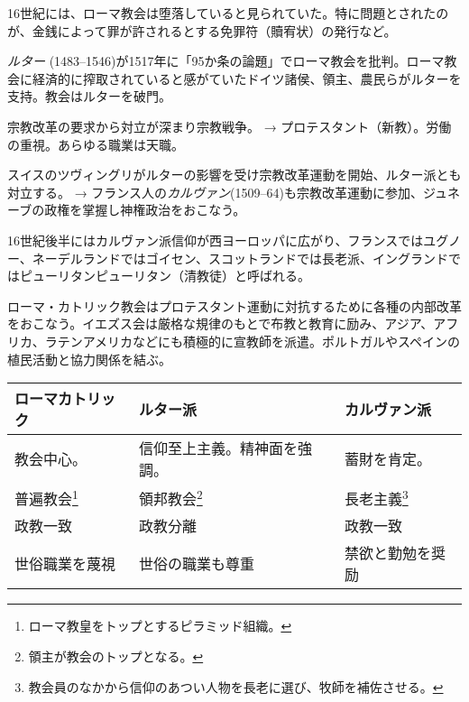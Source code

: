 \documentclass[uplatex,dvipdfmx]{jsarticle} \usepackage{mystyle}%
\begin{document}
16世紀には、ローマ教会は堕落していると見られていた。特に問題とされたのが、金銭によって罪が許されるとする免罪符（贖宥状）の発行など。

\emph{ルター} (1483--1546)が1517年に「95か条の論題」でローマ教会を批判。ローマ教会に経済的に搾取されていると感がていたドイツ諸侯、領主、農民らがルターを支持。教会はルターを破門。

宗教改革の要求から対立が深まり宗教戦争。 → プロテスタント（新教）。労働の重視。あらゆる職業は天職。

スイスのツヴィングリがルターの影響を受け宗教改革運動を開始、ルター派とも対立する。 →
フランス人の\emph{カルヴァン}(1509--64)も宗教改革運動に参加、ジュネーブの政権を掌握し神権政治をおこなう。

16世紀後半にはカルヴァン派信仰が西ヨーロッパに広がり、フランスではユグノー、ネーデルランドではゴイセン、スコットランドでは長老派、イングランドではピューリタンピューリタン（清教徒）と呼ばれる。

ローマ・カトリック教会はプロテスタント運動に対抗するために各種の内部改革をおこなう。イエズス会は厳格な規律のもとで布教と教育に励み、アジア、アフリカ、ラテンアメリカなどにも積極的に宣教師を派遣。ポルトガルやスペインの植民活動と協力関係を結ぶ。



\vspace{1zw}

\begin{tabularx}{1.0\linewidth}{X X X}

  ローマカトリック  & ルター派 & カルヴァン派 \\ \hline

  教会中心。& 信仰至上主義。精神面を強調。 & 蓄財を肯定。 \\
  普遍教会\footnote{ローマ教皇をトップとするピラミッド組織。} & 領邦教会\footnote{領主が教会のトップとなる。} & 長老主義\footnote{教会員のなかから信仰のあつい人物を長老に選び、牧師を補佐させる。} \\
  政教一致 & 政教分離 & 政教一致 \\
  世俗職業を蔑視 & 世俗の職業も尊重 & 禁欲と勤勉を奨励  \\

\end{tabularx}
\vspace{1zw}





\ifx\mybook\undefined


\end{document}
